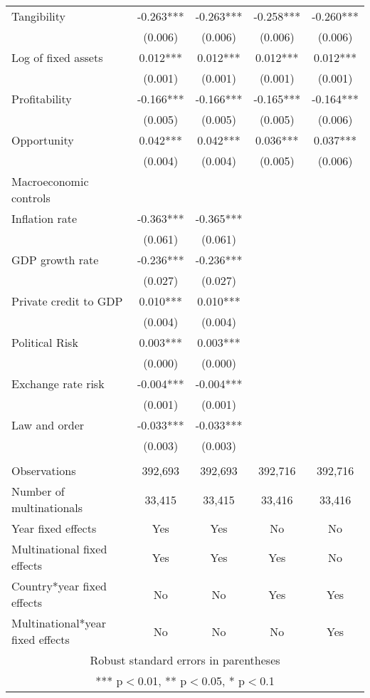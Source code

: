 \begin{longtable}{lcccc}
\quad Tangibility & -0.263*** & -0.263*** & -0.258*** & -0.260*** \\
 & (0.006) & (0.006) & (0.006) & (0.006) \\
\quad Log of fixed assets & 0.012*** & 0.012*** & 0.012*** & 0.012*** \\
 & (0.001) & (0.001) & (0.001) & (0.001) \\
\quad Profitability & -0.166*** & -0.166*** & -0.165*** & -0.164*** \\
 & (0.005) & (0.005) & (0.005) & (0.006) \\
\quad Opportunity & 0.042*** & 0.042*** & 0.036*** & 0.037*** \\
 & (0.004) & (0.004) & (0.005) & (0.006) \\
     Macroeconomic controls &  &  &  \\
\quad Inflation rate & -0.363*** & -0.365*** &  &  \\
 & (0.061) & (0.061) &  &  \\
\quad GDP growth rate & -0.236*** & -0.236*** &  &  \\
 & (0.027) & (0.027) &  &  \\
\quad Private credit to GDP & 0.010*** & 0.010*** &  &  \\
 & (0.004) & (0.004) &  &  \\
\quad Political Risk & 0.003*** & 0.003*** &  &  \\
 & (0.000) & (0.000) &  &  \\
\quad Exchange rate risk & -0.004*** & -0.004*** &  &  \\
 & (0.001) & (0.001) &  &  \\
\quad Law and order & -0.033*** & -0.033*** &  &  \\
 & (0.003) & (0.003) &  &  \\
 &  &  &  &  \\
Observations & 392,693 & 392,693 & 392,716 & 392,716 \\
Number of multinationals & 33,415 & 33,415 & 33,416 & 33,416 \\
Year fixed effects & Yes & Yes & No & No \\
Multinational fixed effects & Yes & Yes & Yes & No \\
Country*year fixed effects & No & No & Yes & Yes \\
 Multinational*year fixed effects & No & No & No & Yes \\ \hline
\multicolumn{5}{c}{ Robust standard errors in parentheses} \\
\multicolumn{5}{c}{ *** p$<$0.01, ** p$<$0.05, * p$<$0.1} \\
\end{longtable}
